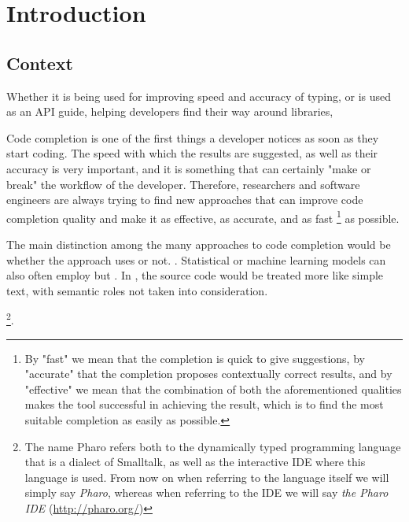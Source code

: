 \chapter{Introduction}
\label{chap:Introduction}

\section{Context}
\label{sec:Introduction-Context}
 Whether it is being used for improving speed and accuracy of typing, or is used as an API guide, helping developers find their way around libraries, 

Code completion is one of the first things a developer notices as soon as they start coding. The speed with which the results are suggested, as well as their accuracy is very important, and it is something that can certainly "make or break" the workflow of the developer. Therefore, researchers and software engineers are always trying to find new approaches that can improve code completion quality and make it as effective, as accurate, and as fast \footnote{By "fast" we mean that the completion is quick to give suggestions, by "accurate" that the completion proposes contextually correct results, and by "effective" we mean that the combination of both the aforementioned qualities makes the tool successful in achieving the result, which is to find the most suitable completion as easily as possible.} as possible.

The main distinction among the many approaches to code completion would be whether the approach uses  or not. . Statistical or machine learning models can also often employ  but . In , the source code would be treated more like simple text, with semantic roles not taken into consideration.

 \footnote{The name Pharo refers both to the dynamically typed programming language that is a dialect of Smalltalk, as well as the interactive IDE where this language is used.  \newline From now on when referring to the language itself we will simply say \textit{Pharo}, whereas when referring to the IDE we will say \textit{the Pharo IDE} (\url{http://pharo.org/})}.


